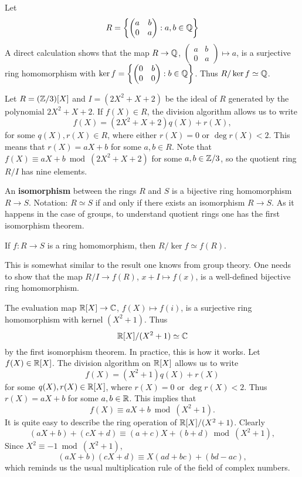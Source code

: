 \chapter{}

\begin{example}
Let 
\[
R=\left\{\begin{pmatrix}
a&b\\
0&a
\end{pmatrix}:a,b\in\mathbb{Q}\right\}
\]
A direct calculation shows that the map $R\to\mathbb{Q}$, $\begin{pmatrix}a&b\\0&a\end{pmatrix}\mapsto a$, is a surjective 
ring homomorphism with  
$\ker f=\left\{\begin{pmatrix}
0&b\\
0&0\end{pmatrix}:b\in\mathbb{Q}\right\}$. 	
Thus $R/\ker f\simeq\mathbb{Q}$. 	
\end{example}

\begin{example}
	Let $R=(\mathbb{Z}/3)[X]$ and $I=(2X^2+X+2)$ be the ideal of $R$ 
	generated by the polynomial $2X^2+X+2$. 	If $f(X)\in R$, 
	the division algorithm allows us to write
	\[
	f(X)=(2X^2+X+2)q(X)+r(X),
	\]
	for some $q(X),r(X)\in R$, where either $r(X)=0$ or $\deg r(X)<2$. 
	This means
	that $r(X)=aX+b$ for some $a,b\in R$.
	Note that
	$f(X)\equiv aX+b\bmod (2X^2+X+2)$
	for some $a,b\in\mathbb{Z}/3$, 
	so the quotient ring $R/I$ has 
	nine elements.  
\end{example}

An \textbf{isomorphism} between the rings $R$ and $S$ is a bijective
ring homomorphism $R\to S$. Notation: $R\simeq S$ if and only if 
there exists an isomorphism $R\to S$. As it happens in the case of groups, 
to understand quotient rings one has 
the first isomorphism theorem. 

\begin{theorem}
	If $f\colon R\to S$ is a ring homomorphism, then $R/\ker f\simeq f(R)$.  	
\end{theorem}

This is somewhat similar to the result one knows from group theory. 
One needs to show that 
the map $R/I\to f(R)$, $x+I\mapsto f(x)$, is a well-defined 
bijective ring homomorphism. 

\begin{example}
    The evaluation map $\mathbb{R}[X]\to\mathbb{C}$, $f(X)\mapsto f(i)$, is a surjective ring
	homomorphism with kernel $(X^2+1)$. Thus 
	\[
	\mathbb{R}[X]/(X^2+1)\simeq\mathbb{C}
	\]
	by the first isomorphism theorem. In practice, this is how it works. Let $f(X)\in\mathbb{R}[X]$. 
	The division algorithm on $\mathbb{R}[X]$ allows us to write
	\[
	f(X)=(X^2+1)q(X)+r(X)
	\]
	for some $q(X),r(X)\in\mathbb{R}[X]$, where $r(X)=0$ or $\deg r(X)<2$. Thus
	$r(X)=aX+b$ for some $a,b\in\mathbb{R}$. This implies that
	\[
	f(X)\equiv aX+b\bmod (X^2+1).
	\] 
	It is quite easy to describe the ring operation of 
	$\mathbb{R}[X]/(X^2+1)$. Clearly 
	\[
	(aX+b)+(cX+d)\equiv (a+c)X+(b+d)\bmod (X^2+1),
	\]
	Since $X^2\equiv -1\bmod (X^2+1)$,   	
	\[
	(aX+b)(cX+d)\equiv X(ad+bc)+(bd-ac), 
	\]
	which reminds us the usual multiplication rule of the field of complex numbers. 
\end{example}

